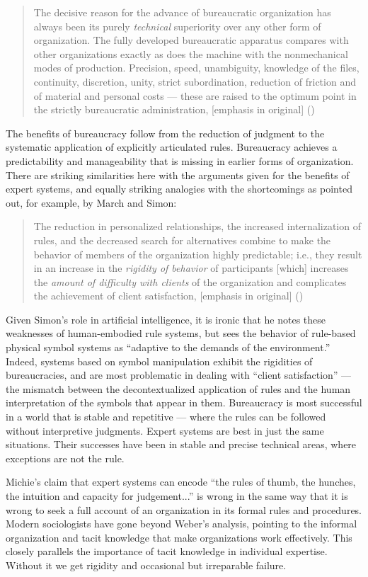 \documentclass[12pt]{article}
\def\bq{\begin{quote}}
\def\eq{\end{quote}}
\begin{document}
\bq
The decisive reason for the advance of bureaucratic organization has always been its purely {\it technical} superiority over any other form of organization. The fully developed bureaucratic apparatus compares with other organizations exactly as does the machine with the nonmechanical modes of production. Precision, speed, unambiguity, knowledge of the files, continuity, discretion, unity, strict subordination, reduction of friction and of material and personal costs --- these are raised to the optimum point in the strictly bureaucratic administration, [emphasis in original] ({\it \cite{weber1968}})
\eq

The benefits of bureaucracy follow from the reduction of judgment to the systematic application of explicitly articulated rules. Bureaucracy achieves a predictability and manageability that is missing in earlier forms of organization. There are striking similarities here with the arguments given for the benefits of expert systems, and equally striking analogies with the shortcomings as pointed out, for example, by March and Simon:

\bq
The reduction in personalized relationships, the increased internalization of rules, and the decreased search for alternatives combine to make the behavior of members of the organization highly predictable; i.e., they result in an increase in the {\it rigidity of behavior} of participants [which] increases the {\it amount of difficulty with clients} of the organization and complicates the achievement of client satisfaction, [emphasis in original] ({\it \cite{march-and-simon1958}})
\eq

Given Simon's role in artificial intelligence, it is ironic that he notes these weaknesses of human-embodied rule systems, but sees the behavior of rule-based physical symbol systems as ``adaptive to the demands of the environment.'' Indeed, systems based on symbol manipulation exhibit the rigidities of bureaucracies, and are most problematic in dealing with ``client satisfaction'' --- the mismatch between the decontextualized application of rules and the human interpretation of the symbols that appear in them. Bureaucracy is most successful in a world that is stable and repetitive --- where the rules can be followed without interpretive judgments. Expert systems are best in just the same situations. Their successes have been in stable and precise technical areas, where exceptions are not the rule.

Michie's claim that expert systems can encode ``the rules of thumb, the hunches, the intuition and capacity for judgement...'' is wrong in the same way that it is wrong to seek a full account of an organization in its formal rules and procedures. Modern sociologists have gone beyond Weber's analysis, pointing to the informal organization and tacit knowledge that make organizations work effectively. This closely parallels the importance of tacit knowledge in individual expertise. Without it we get rigidity and occasional but irreparable failure.
\end{document}
